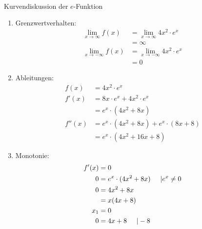 \begin{bsp}{Kurvendiskussion der $e$-Funktion}{}
\begin{enumerate}
\begin{itemize}
\begin{equation*}
\begin{split}
                f(0)&= 4\cdot (0)^2 \cdot e^{0}\\
                &= 4\cdot 0 \cdot 1\\
                &= 0
            \end{split}
        \end{equation*}
    \end{itemize}
    Daraus folgt, dass der Graph $G_f$ der Funktion $f$ durch den Ursprung verläuft.
    \item Grenzwertverhalten:
    \begin{equation*}
            \begin{split}
               \lim_{x\longrightarrow \infty} f(x) &= \lim_{x\longrightarrow \infty} 4x^2\cdot e^x\\
               &=  \infty\\
               \lim_{x\longrightarrow -\infty} f(x) &= \lim_{x\longrightarrow -\infty} 4x^2\cdot e^x\\
               &= 0          
            \end{split}
        \end{equation*}
    \item Ableitungen:
    \begin{equation*}
            \begin{split}
               f(x) &= 4x^2\cdot e^x\\
               f'(x) &= 8x\cdot e^x + 4x^2 \cdot e^x\\
                    &= e^x \cdot (4x^2+8x)\\
                f''(x) &= e^x \cdot (4x^2+8x) + e^x \cdot (8x+8)\\
                 &= e^x\cdot (4x^2 +16x+8)
            \end{split}
        \end{equation*}
        \item Monotonie:
            \begin{equation*}
            \begin{split}
                f'(x)&=0\\
                0&= e^x \cdot (4x^2+8x) \hspace{0.5cm} | e^x \neq 0\\
                0&= 4x^2+8x\\
                &= x(4x+8)\\
                x_1 &= 0\\
                0&= 4x+8\hspace{0.5cm} | -8\\ 

\end{split}
\end{equation*}
\end{enumerate}
\end{bsp}
